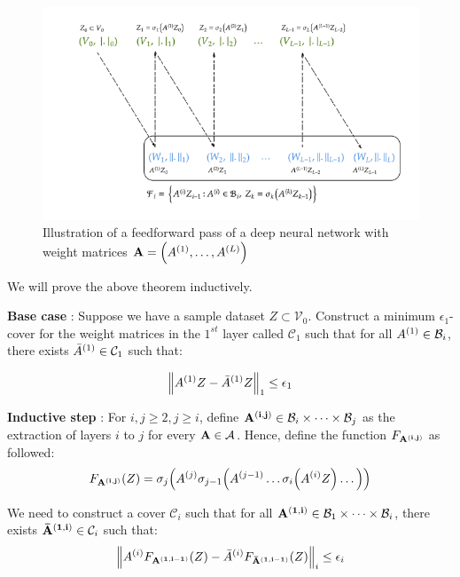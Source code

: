 \begin{proof*}
    \begin{figure}[!ht]
        \centering
        \includegraphics[width=\textwidth]{figures/neural-network.png}
        \caption{Illustration of a feedforward pass of a deep neural network with weight matrices ${\bf A}=\Big( A^{(1)}, \dots, A^{(L)} \Big)$}
        \label{fig:neural-network-illustration}
    \end{figure}

    \noindent We will prove the above theorem inductively. 
    
    \noindent\newline\textbf{Base case} : Suppose we have a sample dataset $Z\subset\mathcal{V}_0$. Construct a minimum $\epsilon_1$-cover for the weight matrices in the $1^{st}$ layer called $\mathcal{C}_1$ such that for all $A^{(1)}\in\mathcal{B}_i$, there exists ${\bar A}^{(1)}\in\mathcal{C}_1$ such that:

    \begin{align*}
        \Big\|A^{(1)}Z - {\bar A}^{(1)}Z\Big\|_1 \le \epsilon_1
    \end{align*} 
    
    
    \noindent \textbf{Inductive step} : For $i, j \ge 2, j \ge i$, define ${\bf A^{(i, j)}}\in\mathcal{B}_i\times\dots\times\mathcal{B}_j$ as the extraction of layers $i$ to $j$ for every ${\bf A}\in\mathcal{A}$. Hence, define the function $F_{\bf A^{(i, j)}}$ as followed:
    \begin{align*}
        F_{\bf A^{(i, j)}}(Z) = \sigma_j\Big( 
            A^{(j)}\sigma_{j-1}\Big( 
                A^{(j-1)}\dots\sigma_i\Big( A^{(i)}Z \Big)\dots
             \Big)
         \Big)
    \end{align*} 
    
    
    \noindent We need to construct a cover $\mathcal{C}_i$ such that for all ${\bf A^{(1, i)}}\in \mathcal{B}_1\times\dots\times\mathcal{B}_i$, there exists ${\bf {\bar A}^{(1, i)}}\in \mathcal{C}_{i}$ such that: 
    \begin{align*}
        \Big\|
            A^{(i)}F_{\bf A^{(1, i-1)}}(Z) - {\bar A}^{(i)}F_{\bf {\bar A}^{(1, i-1)}}(Z)
        \Big\|_i \le \epsilon_i
    \end{align*}


\end{proof*}
